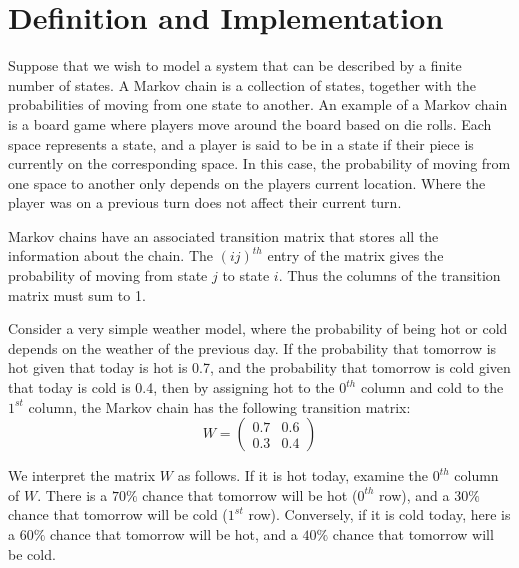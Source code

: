 \label{lab:Markov}


\section*{Definition and Implementation}

Suppose that we wish to model a system that can be described by a finite number of states.
A Markov chain is a collection of states, together with the probabilities of moving from one state to another.
An example of a Markov chain is a board game where players move around the board based on die rolls.
Each space represents a state, and a player is said to be in a state if their piece is currently on the corresponding space.
In this case, the probability of moving from one space to another only depends on the players current location.
Where the player was on a previous turn does not affect their current turn.

Markov chains have an associated transition matrix that stores all the information about the chain.
The $(ij)^{th}$ entry of the matrix gives the probability of moving from state $j$ to state $i$.
Thus the columns of the transition matrix must sum to 1.

Consider a very simple weather model, where the probability of being hot or cold depends on the weather of the previous day.
If the probability that tomorrow is hot given that today is hot is 0.7, and the probability that tomorrow is cold given that today is cold is 0.4, then by assigning hot to the $0^{th}$ column and cold to the $1^{st}$ column, the Markov chain has the following transition matrix:
\[ W = \left( \begin{array}{cc}
0.7 & 0.6 \\
0.3 & 0.4 \end{array} \right)\] 

We interpret the matrix $W$ as follows.
If it is hot today, examine the $0^{th}$ column of $W$.
There is a $70\%$ chance that tomorrow will be hot ($0^{th}$ row), and a $30\%$ chance that tomorrow will be cold ($1^{st}$ row).
Conversely, if it is cold today, here is a $60\%$ chance that tomorrow will be hot, and a $40\%$ chance that tomorrow will be cold.

